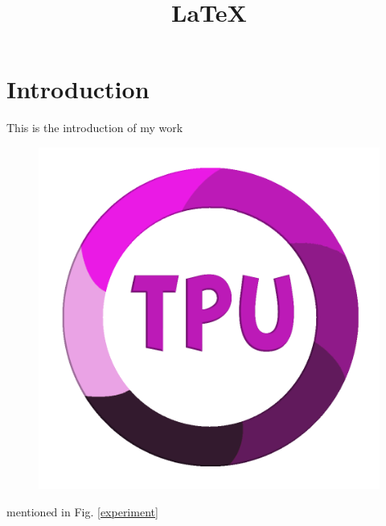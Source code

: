 \documentclass[twocolumn]{article}
\title{ \LaTeX}
\begin{document}
	\maketitle
	
\section{Introduction}
This is the introduction of my work

	\begin{figure}
		\includegraphics{V.png}
	\end{figure}

	mentioned in Fig. \ref{experiment}
\end{document}

